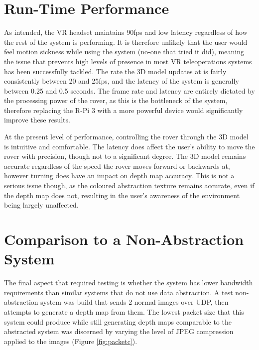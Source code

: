 \section{Run-Time Performance}

As intended, the VR headset maintains 90fps and low latency regardless of how the rest of the system is performing. It is therefore unlikely that the user would feel motion sickness while using the system (no-one that tried it did), meaning the issue that prevents high levels of presence in most VR teleoperations systems has been successfully tackled. The rate the 3D model updates at is fairly consistently between 20 and 25fps, and the latency of the system is generally between 0.25 and 0.5 seconds. The frame rate and latency are entirely dictated by the processing power of the rover, as this is the bottleneck of the system, therefore replacing the R-Pi 3 with a more powerful device would significantly improve these results.

At the present level of performance, controlling the rover through the 3D model is intuitive and comfortable. The latency does affect the user's ability to move the rover with precision, though not to a significant degree. The 3D model remains accurate regardless of the speed the rover moves forward or backwards at, however turning does have an impact on depth map accuracy. This is not a serious issue though, as the coloured abstraction texture remains accurate, even if the depth map does not, resulting in the user's awareness of the environment being largely unaffected.

\section{Comparison to a Non-Abstraction System}

The final aspect that required testing is whether the system has lower bandwidth requirements than similar systems that do not use data abstraction. A test non-abstraction system was build that sends 2 normal images over UDP, then attempts to generate a depth map from them. The lowest packet size that this system could produce while still generating depth maps comparable to the abstracted system was discerned by varying the level of JPEG compression applied to the images (Figure \ref{fig:packetc}).

